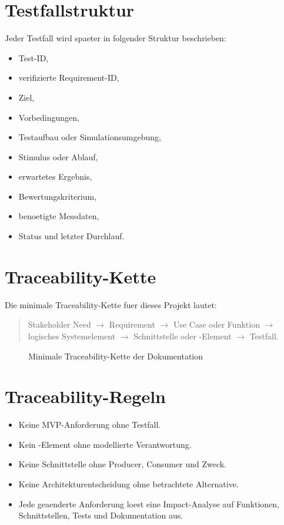 \section{Testfallstruktur}

Jeder Testfall wird spaeter in folgender Struktur beschrieben:
\begin{itemize}
  \item Test-ID,
  \item verifizierte Requirement-ID,
  \item Ziel,
  \item Vorbedingungen,
  \item Testaufbau oder Simulationsumgebung,
  \item Stimulus oder Ablauf,
  \item erwartetes Ergebnis,
  \item Bewertungskriterium,
  \item benoetigte Messdaten,
  \item Status und letzter Durchlauf.
\end{itemize}

\section{Traceability-Kette}

Die minimale Traceability-Kette fuer dieses Projekt lautet:
\begin{quote}
Stakeholder Need $\rightarrow$ Requirement $\rightarrow$ Use Case oder Funktion $\rightarrow$ logisches Systemelement $\rightarrow$ Schnittstelle oder \ros-Element $\rightarrow$ Testfall.
\end{quote}

\begin{figure}[htbp]
  \centering
  \resizebox{\textwidth}{!}{}
  \caption{Minimale Traceability-Kette der Dokumentation}
  \label{fig:traceability-chain}
\end{figure}

\section{Traceability-Regeln}

\begin{itemize}
  \item Keine MVP-Anforderung ohne Testfall.
  \item Kein \ros-Element ohne modellierte Verantwortung.
  \item Keine Schnittstelle ohne Producer, Consumer und Zweck.
  \item Keine Architekturentscheidung ohne betrachtete Alternative.
  \item Jede geaenderte Anforderung loest eine Impact-Analyse auf Funktionen, Schnittstellen, Tests und Dokumentation aus.
\end{itemize}
